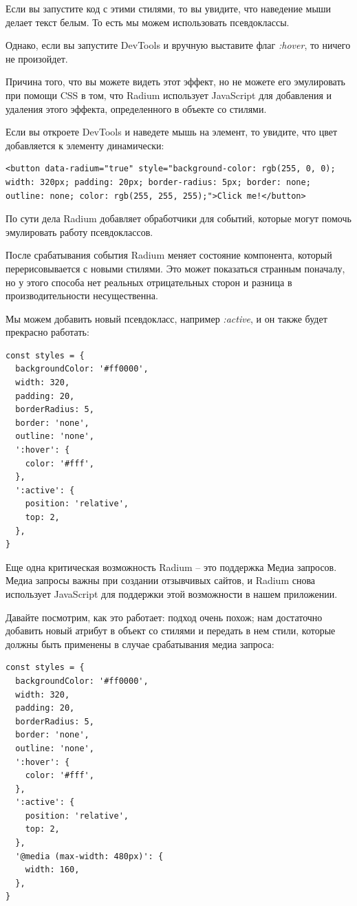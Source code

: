 Если вы запустите код с этими стилями, то вы увидите, что наведение мыши делает текст белым. То есть мы можем использовать псевдоклассы.

Однако, если вы запустите DevTools и вручную выставите флаг \textit{:hover}, то ничего не произойдет.

Причина того, что вы можете видеть этот эффект, но не можете его эмулировать при помощи CSS в том, что Radium использует JavaScript для добавления и удаления этого эффекта, определенного в объекте со стилями.

Если вы откроете DevTools и наведете мышь на элемент, то увидите, что цвет добавляется к элементу динамически:

\begin{lstlisting}
<button data-radium="true" style="background-color: rgb(255, 0, 0); width: 320px; padding: 20px; border-radius: 5px; border: none; outline: none; color: rgb(255, 255, 255);">Click me!</button>
\end{lstlisting}

По сути дела Radium добавляет обработчики для событий, которые могут помочь эмулировать работу псевдоклассов.

После срабатывания события Radium меняет состояние компонента, который перерисовывается с новыми стилями. Это может показаться странным поначалу, но у этого способа нет реальных отрицательных сторон и разница в производительности несущественна. 

Мы можем добавить новый псевдокласс, например \textit{:active}, и он также будет прекрасно работать:

\begin{lstlisting}
const styles = {
  backgroundColor: '#ff0000',
  width: 320,
  padding: 20,
  borderRadius: 5,
  border: 'none',
  outline: 'none',
  ':hover': {
    color: '#fff',
  },
  ':active': {
    position: 'relative',
    top: 2,
  }, 
}
\end{lstlisting}

Еще одна критическая возможность Radium -- это поддержка Медиа запросов. Медиа запросы важны при создании отзывчивых сайтов, и Radium снова использует JavaScript для поддержки этой возможности в нашем приложении.

Давайте посмотрим, как это работает: подход очень похож; нам достаточно добавить новый атрибут в объект со стилями и передать в нем стили, которые должны быть применены в случае срабатывания медиа запроса:

\begin{lstlisting}
const styles = {
  backgroundColor: '#ff0000',
  width: 320,
  padding: 20,
  borderRadius: 5,
  border: 'none',
  outline: 'none',
  ':hover': {
    color: '#fff',
  },
  ':active': {
    position: 'relative',
    top: 2,
  },
  '@media (max-width: 480px)': {
    width: 160,
  },
}
\end{lstlisting}

